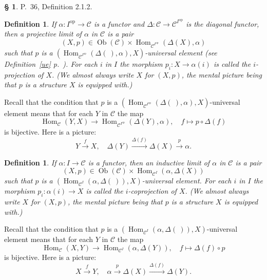 \documentclass[12pt]{article}%
\newtheorem{df}[thm]{Definition}%
\theoremstyle{remark}
\theoremstyle{definition}
\newtheorem{s}[thm]{\S}%
\newcommand{\C}{\mathcal C}
\newcommand{\xr}{\xrightarrow}
\DeclareMathOperator{\Hom}{Hom}%
\DeclareMathOperator{\Ob}{Ob}
\DeclareMathOperator{\op}{op}
\begin{document}
\begin{s} 
P.~36, Definition 2.1.2. 

\begin{df}\label{p}
If $\alpha:I^{\op}\to\C$ is a functor and $\Delta:\C\to\C^{I^{\op}}$ is the diagonal functor, then a {\em projective limit of} $\alpha$ {\em in} $\C$ is a pair 
$$
(X,p)\in\Ob(\C)\times\Hom_{\C^{I^{\op}}}(\Delta(X),\alpha)
$$
such that $p$ is a $(\Hom_{\C^{I^{\op}}}(\Delta(\ ),\alpha),X)$\--universal element (see Definition~\ref{ue} p.~\pageref{ue}). For each $i$ in $I$ the morphism $p_i:X\to\alpha(i)$ is called the $i$-{\em projection} of $X$. (We almost always write $X$ for $(X,p)$, the mental picture being that $p$ is a structure $X$ is equipped with.)
\end{df}

Recall that the condition that $p$ is a $(\Hom_{\C^{I^{\op}}}(\Delta(\ ),\alpha),X)$\--universal element means that for each $Y$ in $\C$ the map 
$$
\Hom_\C(Y,X)\to\Hom_{\C^{I^{\op}}}(\Delta(Y),\alpha),\quad f\mapsto p\circ\Delta(f)
$$ 
is bijective. Here is a picture:
$$
Y\xr fX,\quad\Delta(Y)\xr{\Delta(f)}\Delta(X)\xr{p}\alpha.
$$

\begin{df}\label{c}
If $\alpha:I\to\C$ is a functor, then an {\em inductive limit of} $\alpha$ {\em in} $\C$ is a pair 
$$
(X,p)\in\Ob(\C)\times\Hom_{\C^I}(\alpha,\Delta(X))
$$
such that $p$ is a $(\Hom_{\C^I}(\alpha,\Delta(\ )),X)$\--universal element. For each $i$ in $I$ the morphism $p_i:\alpha(i)\to X$ is called the $i$-{\em coprojection} of $X$. (We almost always write $X$ for $(X,p)$, the mental picture being that $p$ is a structure $X$ is equipped with.)
\end{df}

Recall that the condition that $p$ is a $(\Hom_{\C^I}(\alpha,\Delta(\ )),X)$\--universal element means that for each $Y$ in $\C$ the map 
\begin{equation}\label{cue}
\Hom_\C(X,Y)\to\Hom_{\C^I}(\alpha,\Delta(Y)),\quad f\mapsto\Delta(f)\circ p
\end{equation}
is bijective. Here is a picture:
$$
X\xr fY,\quad\alpha\xr{p}\Delta(X)\xr{\Delta(f)}\Delta(Y).
$$
\end{s}
\end{document}
